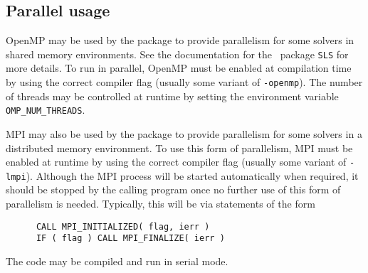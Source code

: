 
\subsection{Parallel usage}
OpenMP may be used by the {\tt \fullpackagename} package to provide
parallelism for some solvers in shared memory environments.
See the documentation for the \galahad\ package {\tt SLS} for more details.
To run in parallel, OpenMP
must be enabled at compilation time by using the correct compiler flag
(usually some variant of {\tt -openmp}).
The number of threads may be controlled at runtime
by setting the environment variable {\tt OMP\_NUM\_THREADS}.

\noindent
MPI may also be used by the package to provide
parallelism for some solvers in a distributed memory environment.
To use this form of parallelism, MPI must be enabled at runtime
by using the correct compiler flag
(usually some variant of {\tt -lmpi}).
Although the MPI process will be started automatically when required,
it should be stopped by the calling program once no further use of
this form of parallelism is needed. Typically, this will be via
statements of the form
\begin{verbatim}
      CALL MPI_INITIALIZED( flag, ierr )
      IF ( flag ) CALL MPI_FINALIZE( ierr )
\end{verbatim}

\noindent
The code may be compiled and run in serial mode.
